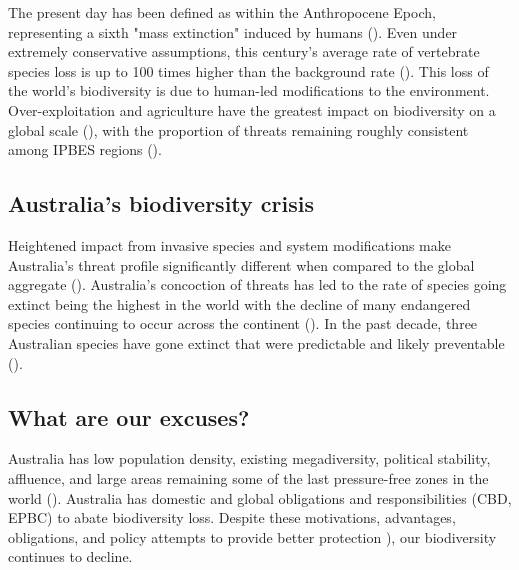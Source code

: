 \documentclass[a4paper,11pt]{article}
\begin{document}
The present day has been defined as within the Anthropocene Epoch, representing a sixth "mass extinction" induced by humans (\cite{lewisDefiningAnthropocene2015}). Even under extremely conservative assumptions, this century's average rate of vertebrate species loss is up to 100 times higher than the background rate (\cite{ceballosAcceleratedModernHuman2015}). This loss of the world's biodiversity is due to human-led modifications to the environment. Over-exploitation and agriculture have the greatest impact on biodiversity on a global scale (\cite{maxwellBiodiversityRavagesGuns2016}), with the proportion of threats remaining roughly consistent among IPBES regions (\cite{w.w.f.LivingPlanetReport2020}).

\subsection{Australia's biodiversity crisis}

Heightened impact from invasive species and system modifications make Australia's threat profile significantly different when compared to the global aggregate (\cite{kearneyThreatsAustraliaImperilled2019}). Australia's concoction of threats has led to the rate of species going extinct being the highest in the world with the decline of many endangered species continuing to occur across the continent (\cite{simmondsVulnerableSpeciesEcosystems2020}). In the past decade, three Australian species have gone extinct that were predictable and likely preventable (\cite{woinarskiContributionPolicyLaw2017}).

\subsection{What are our excuses?}

Australia has low population density, existing megadiversity, political stability, affluence, and large areas remaining some of the last pressure-free zones in the world (\cite{venterSixteenYearsChange2016}). Australia has domestic and global obligations and responsibilities (CBD, EPBC) to abate biodiversity loss. Despite these motivations, advantages, obligations, and policy attempts to provide better protection \cite{wardLotsLossLittle2019}), our biodiversity continues to decline.
\end{document}
